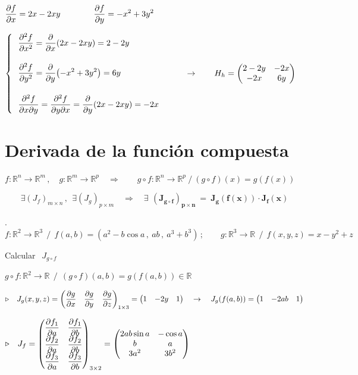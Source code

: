 $ \displaystyle \pdv{f}{x}=2x-2xy \qquad \qquad \pdv{f}{y}=-x^2+3y^2$

$\begin{cases}
\ \ \displaystyle \pdv[2]{f}{x}=\pdv{x}(2x-2xy)=2-2y \\ \\
\ \ \displaystyle \pdv[2]{f}{y}=\pdv{y}(-x^2+3y^2)=6y \\ \\
\ \ \displaystyle \pdv[2]{f}{x}{y}=\pdv[2]{f}{y}{x}=\pdv{y}(2x-2xy)=-2x 
\end{cases} \qquad \rightarrow \qquad H_h=\mqty(2-2y&-2x\\-2x&6y)$


\section{Derivada de la función compuesta}

$f:\mathbb R^n \to \mathbb R^m\, , \quad g:\mathbb R^m \to \mathbb R^p \quad \Rightarrow \qquad g \circ f :\mathbb R^n \to \mathbb R^p \ / \ (g\circ f)(x)=g(f(x))$

\begin{equation}
\label{app-deriv-cmpta}
\exists (J_f)_{m\times n}\, , \ \ \exists (J_g)_{p\times m} \quad \Rightarrow \quad \exists \, \  \boldsymbol{(J_{g\circ f})_{p\times n} \ = \ J_g(f(x))\cdot J_f(x)}
\end{equation}


\begin{example}
.	$f : \mathbb R^2 \to \mathbb R^3 \ \ / \ \ f(a,b)=(a^2-b\cos a\, , \ ab\, , \ a^3+b^3) \, ; \qquad 	g : \mathbb R^3 \to \mathbb R \ \ / \ \ f(x,y,z)=x-y^2+z$

\vspace{3mm} Calcular $\ \ J_{g\circ f}$
\end{example}

$g\circ f :\mathbb R^2 \to \mathbb R \ \ / \ \ (g\circ f)(a,b)=g(f(a,b)) \in \mathbb R$

$\triangleright \quad J_g(x,y,z)=\mqty( \displaystyle \pdv{g}{x} & \displaystyle \pdv{g}{y} & \displaystyle \pdv{g}{z})_{1\times 3}= \mqty(1&-2y&1) \quad \to \quad J_g(f(a,b))=\mqty(1& -2ab&1)$

$\triangleright \quad J_f= \mqty( \displaystyle \pdv{f_1}{a} & \displaystyle \pdv{f_1}{b} \\ \displaystyle \pdv{f_2}{a} & \displaystyle \pdv{f_2}{b} \\ \displaystyle \pdv{f_3}{a} & \displaystyle \pdv{f_3}{b})_{3\times 2}=\mqty(2ab\sin a & -\cos a \\ b&a\\3a^2&3b^2)$

